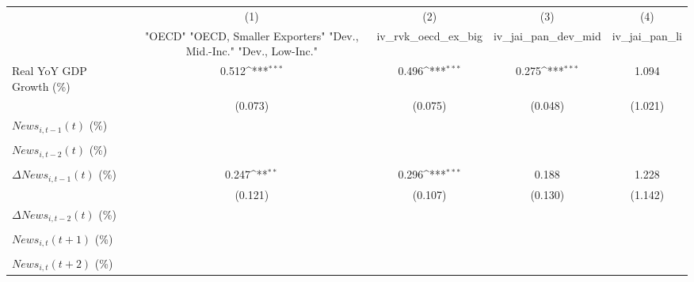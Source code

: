 {
\def\sym#1{\ifmmode^{#1}\else\(^{#1}\)\fi}
\begin{tabular}{l*{4}{c}}
\toprule
                    &\multicolumn{1}{c}{(1)}&\multicolumn{1}{c}{(2)}&\multicolumn{1}{c}{(3)}&\multicolumn{1}{c}{(4)}\\
                    &\multicolumn{1}{c}{ "OECD" "OECD, Smaller Exporters" "Dev., Mid.-Inc." "Dev., Low-Inc."}&\multicolumn{1}{c}{iv_rvk_oecd_ex_big}&\multicolumn{1}{c}{iv_jai_pan_dev_mid}&\multicolumn{1}{c}{iv_jai_pan_li}\\
\midrule
Real YoY GDP Growth (\%)&       0.512\sym{***}&       0.496\sym{***}&       0.275\sym{***}&       1.094         \\
                    &     (0.073)         &     (0.075)         &     (0.048)         &     (1.021)         \\
\addlinespace
$ News_{i,t-1}(t)$ (\%)&                     &                     &                     &                     \\
                    &                     &                     &                     &                     \\
\addlinespace
$ News_{i,t-2}(t)$ (\%)&                     &                     &                     &                     \\
                    &                     &                     &                     &                     \\
\addlinespace
$ \Delta News_{i,t-1}(t)$ (\%)&       0.247\sym{**} &       0.296\sym{***}&       0.188         &       1.228         \\
                    &     (0.121)         &     (0.107)         &     (0.130)         &     (1.142)         \\
\addlinespace
$ \Delta News_{i,t-2}(t)$ (\%)&                     &                     &                     &                     \\
                    &                     &                     &                     &                     \\
\addlinespace
$ News_{i,t}(t+1)$ (\%)&                     &                     &                     &                     \\
                    &                     &                     &                     &                     \\
\addlinespace
$ News_{i,t}(t+2)$ (\%)&                     &                     &                     &                     \\

\end{tabular}}
